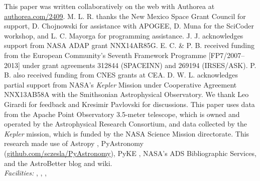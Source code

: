 \acknowledgments
This paper was written collaboratively on the web with Authorea at \url{authorea.com/2409}. M. L. R. thanks the New Mexico Space Grant Council for support, D. Chojnowski for assistance with APOGEE, D. Muna for the SciCoder workshop, and L. C. Mayorga for programming assistance. J. J. acknowledges support from NASA ADAP grant NNX14AR85G. E. C. \& P. B. received funding from the European Community's Seventh Framework Programme [FP7/2007--2013] under grant agreements 312844 (SPACEINN) and 269194 (IRSES/ASK). P. B. also received funding from CNES grants at CEA. D. W. L. acknowledges partial support from NASA's \emph{Kepler} Mission under Cooperative Agreement NNX13AB58A with the Smithsonian Astrophysical Observatory. We thank Leo Girardi for feedback and Kresimir Pavlovski for discussions. This paper uses data from the Apache Point Observatory 3.5-meter telescope, which is owned and operated by the Astrophysical Research Consortium, and data collected by the \emph{Kepler} mission, which is funded by the NASA Science Mission directorate. This research made use of Astropy \citep{astropy}, PyAstronomy (\url{github.com/sczesla/PyAstronomy}), PyKE \citep{pyke}, NASA's ADS Bibliographic Services, and the AstroBetter blog and wiki.
\\

{\it Facilities:} , , , 

  